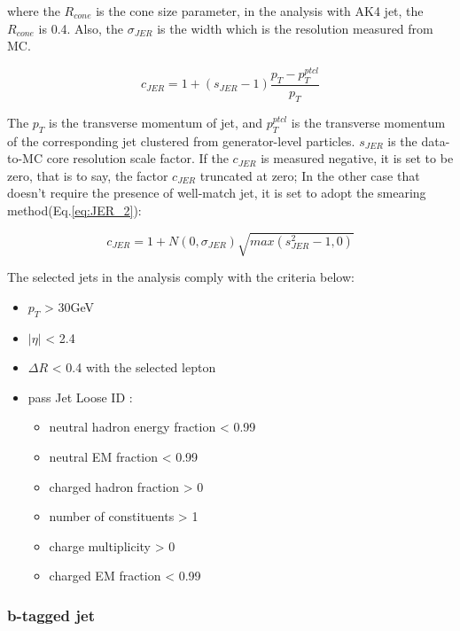 		where the $R_{cone}$ is the cone size parameter, in the analysis with AK4 jet, the $R_{cone}$ is 0.4. Also, the $\sigma_{JER}$ is the width which is the resolution measured from MC.

		\begin{equation}
		c_{JER} = 1 + (s_{JER} - 1)\frac{p_T-p_T^{ptcl}}{p_T}
		\label{eq:JER_1}
		\end{equation}
		\FloatBarrier

		The $p_T$ is the transverse momentum of jet, and $p_T^{ptcl}$ is the transverse momentum of the corresponding jet clustered from generator-level particles. $s_{JER}$ is the data-to-MC core resolution scale factor. If the $c_{JER}$ is measured negative, it is set to be zero, that is to say, the factor $c_{JER}$ truncated at zero; In the other case that doesn't require the presence of well-match jet, it is set to adopt the smearing method(Eq.\ref{eq:JER_2}):

		\begin{equation}
		c_{JER} = 1 + N(0,\sigma_{JER})\sqrt{max(s_{JER}^2-1,0)}
		\label{eq:JER_2}
		\end{equation}
		\FloatBarrier

		The selected jets in the analysis comply with the criteria below:

		\begin{itemize}
		\item $p_T$ > 30GeV
		\item $|\eta|$ < 2.4
		\item $\Delta R$ < 0.4 with the selected lepton
		\item pass Jet Loose ID : \cite{JetLooseID_twiki}
		\begin{itemize}
			\item neutral hadron energy fraction < 0.99
			\item neutral EM fraction < 0.99
			\item charged hadron fraction > 0
			\item number of constituents > 1
			\item charge multiplicity > 0
			\item charged EM fraction < 0.99
		\end{itemize}
		\label{PhysObj:itm:sel_jet}
		\end{itemize}
		

		\subsubsection{b-tagged jet}
		\label{sssec:bjet}

